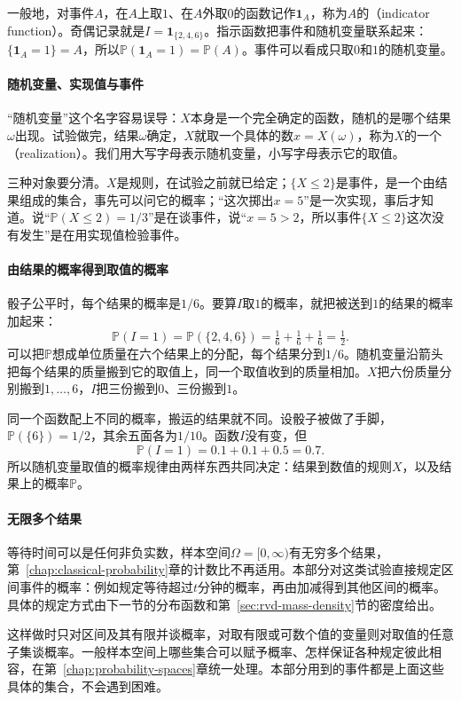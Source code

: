 一般地，对事件$A$，在$A$上取$1$、在$A$外取$0$的函数记作$\mathbf{1}_{A}$，称为$A$的（indicator function）。奇偶记录就是$I=\mathbf{1}_{\{2,4,6\}}$。指示函数把事件和随机变量联系起来：$\{\mathbf{1}_{A}=1\}=A$，所以$\mathbb{P}(\mathbf{1}_{A}=1)=\mathbb{P}(A)$。事件可以看成只取$0$和$1$的随机变量。

\paragraph{随机变量、实现值与事件}
“随机变量”这个名字容易误导：$X$本身是一个完全确定的函数，随机的是哪个结果$\omega$出现。试验做完，结果$\omega$确定，$X$就取一个具体的数$x=X(\omega)$，称为$X$的一个（realization）。我们用大写字母表示随机变量，小写字母表示它的取值。

三种对象要分清。$X$是规则，在试验之前就已给定；$\{X\leq 2\}$是事件，是一个由结果组成的集合，事先可以问它的概率；“这次掷出$x=5$”是一次实现，事后才知道。说“$\mathbb{P}(X\leq 2)=1/3$”是在谈事件，说“$x=5>2$，所以事件$\{X\leq2\}$这次没有发生”是在用实现值检验事件。

\paragraph{由结果的概率得到取值的概率}
骰子公平时，每个结果的概率是$1/6$。要算$I$取$1$的概率，就把被送到$1$的结果的概率加起来：
\[
  \mathbb{P}(I=1)=\mathbb{P}(\{2,4,6\})=\tfrac16+\tfrac16+\tfrac16=\tfrac12 .
\]
可以把$\mathbb{P}$想成单位质量在六个结果上的分配，每个结果分到$1/6$。随机变量沿箭头把每个结果的质量搬到它的取值上，同一个取值收到的质量相加。$X$把六份质量分别搬到$1,\dots,6$，$I$把三份搬到$0$、三份搬到$1$。

同一个函数配上不同的概率，搬运的结果就不同。设骰子被做了手脚，$\mathbb{P}(\{6\})=1/2$，其余五面各为$1/10$。函数$I$没有变，但
\[
  \mathbb{P}(I=1)=0.1+0.1+0.5=0.7 .
\]
所以随机变量取值的概率规律由两样东西共同决定：结果到数值的规则$X$，以及结果上的概率$\mathbb{P}$。

\paragraph{无限多个结果}
等待时间可以是任何非负实数，样本空间$\Omega=[0,\infty)$有无穷多个结果，第~\ref{chap:classical-probability}章的计数比不再适用。本部分对这类试验直接规定区间事件的概率：例如规定等待超过$t$分钟的概率，再由加减得到其他区间的概率。具体的规定方式由下一节的分布函数和第~\ref{sec:rvd-mass-density}节的密度给出。

这样做时只对区间及其有限并谈概率，对取有限或可数个值的变量则对取值的任意子集谈概率。一般样本空间上哪些集合可以赋予概率、怎样保证各种规定彼此相容，在第~\ref{chap:probability-spaces}章统一处理。本部分用到的事件都是上面这些具体的集合，不会遇到困难。

